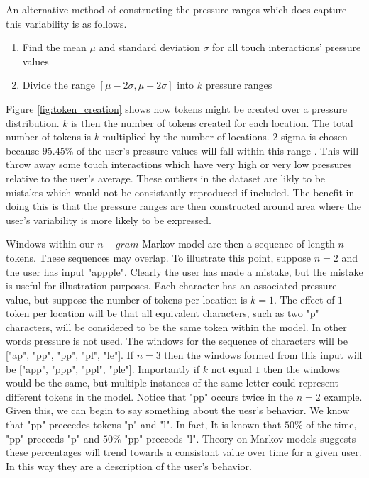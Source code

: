 An alternative method of constructing
the pressure ranges which does capture 
this variability is as follows.
%
\begin{enumerate}
\item Find the mean $\mu$ and standard deviation $\sigma$ 
  for all touch interactions' pressure values
\item Divide the range $[\mu-2\sigma, \mu+2\sigma]$ into $k$ pressure ranges
\end{enumerate}
%
Figure \ref{fig:token_creation} shows
how tokens might be created over a pressure distribution.
%
$k$ is then the number of tokens created for each location.
The total number of tokens is $k$ multiplied by the number of locations.
$2$ sigma is chosen because $95.45\%$ of the user's pressure values
will fall within this range
\cite{threesigmarule}.
%
%
This will throw away some touch interactions
which have very high or very low pressures
relative to the user's average.
%
These outliers in the dataset are likly to be mistakes
which would not be consistantly reproduced if included. 
%
The benefit in doing this is
that the pressure ranges are then constructed around
area where the user's variability is more likely to be expressed.


Windows within our $n-gram$ Markov model are then
a sequence of length $n$ tokens.
%
These sequences may overlap.
To illustrate this point,
suppose $n = 2$ and the user has input "appple".
Clearly the user has made a mistake, but
the mistake is useful for illustration purposes.
%
Each character has an associated pressure value,
but suppose the number of tokens per location is $k=1$.
The effect of $1$ token per location
will be that all equivalent characters,
such as two "p" characters, 
will be considered to be the same token within the model.
In other words pressure is not used.
%
The windows for the sequence of characters will be
["ap", "pp", "pp", "pl", "le"].
%
If $n = 3$ then
the windows formed from this input will be
["app", "ppp", "ppl", "ple"].
%
Importantly if $k$ not equal $1$ then
the windows would be the same, but 
multiple instances of the same letter
could represent different tokens in the model.
%
Notice that "pp" occurs twice in the $n = 2$ example.
Given this,
we can begin to say something about the uesr's behavior.
%
We know that "pp" preceedes tokens "p" and "l".
In fact,
It is known that $50\%$ of the time,
"pp" preceeds "p" and
$50\%$ "pp" preceeds "l".
%
Theory on Markov models suggests
these percentages will trend towards a
consistant value over time
for a given user.
In this way they 
are a description of the user's behavior.

